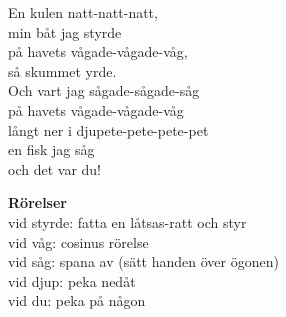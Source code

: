 \vspace{10pt}
En kulen natt-natt-natt,\\
min båt jag styrde\\
på havets vågade-vågade-våg,\\
så skummet yrde.\\
Och vart jag sågade-sågade-såg\\
på havets vågade-vågade-våg\\
långt ner i djupete-pete-pete-pet\\
en fisk jag såg\\
och det var du!\par
\vspace{10pt}
\textbf{Rörelser}\\
vid styrde: fatta en låtsas-ratt och styr\\
vid våg: cosinus rörelse\\
vid såg: spana av (sätt handen över ögonen)\\
vid djup: peka nedåt\\
vid du: peka på någon

